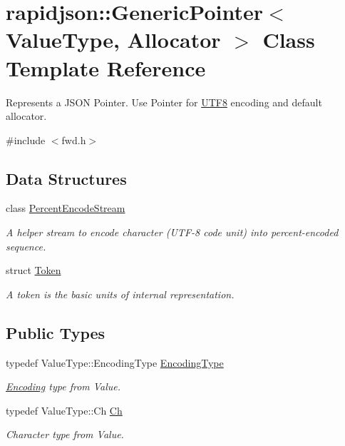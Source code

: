 \hypertarget{classrapidjson_1_1_generic_pointer}{}\section{rapidjson\+::Generic\+Pointer$<$ Value\+Type, Allocator $>$ Class Template Reference}
\label{classrapidjson_1_1_generic_pointer}


Represents a J\+S\+ON Pointer. Use Pointer for \mbox{\hyperlink{structrapidjson_1_1_u_t_f8}{U\+T\+F8}} encoding and default allocator.  




{\ttfamily \#include $<$fwd.\+h$>$}

\subsection*{Data Structures}
\begin{DoxyCompactItemize}
\item 
class \mbox{\hyperlink{classrapidjson_1_1_generic_pointer_1_1_percent_encode_stream}{Percent\+Encode\+Stream}}
\begin{DoxyCompactList}\small\item\em A helper stream to encode character (U\+T\+F-\/8 code unit) into percent-\/encoded sequence. \end{DoxyCompactList}\item 
struct \mbox{\hyperlink{structrapidjson_1_1_generic_pointer_1_1_token}{Token}}
\begin{DoxyCompactList}\small\item\em A token is the basic units of internal representation. \end{DoxyCompactList}\end{DoxyCompactItemize}
\subsection*{Public Types}
\begin{DoxyCompactItemize}
\item 
typedef Value\+Type\+::\+Encoding\+Type \mbox{\hyperlink{classrapidjson_1_1_generic_pointer_a399790c5fe8076d91a58c621c0c2a79e}{Encoding\+Type}}
\begin{DoxyCompactList}\small\item\em \mbox{\hyperlink{classrapidjson_1_1_encoding}{Encoding}} type from Value. \end{DoxyCompactList}\item 
typedef Value\+Type\+::\+Ch \mbox{\hyperlink{classrapidjson_1_1_generic_pointer_a850f78846c5548565f8395be5f3427b7}{Ch}}
\begin{DoxyCompactList}\small\item\em Character type from Value. \end{DoxyCompactList}\end{DoxyCompactItemize}
